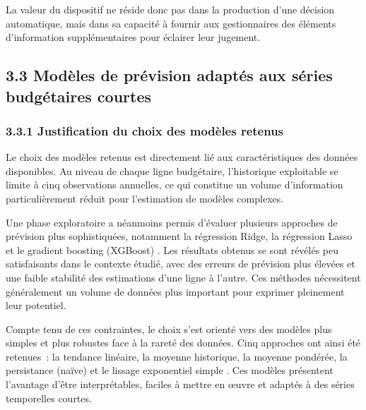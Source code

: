 La valeur du dispositif ne r\'eside donc pas dans la production d'une
d\'ecision automatique, mais dans sa capacit\'e \`a fournir aux gestionnaires
des \'el\'ements d'information suppl\'ementaires pour \'eclairer leur jugement.

\subsection*{3.3 \quad Mod\`eles de pr\'evision adapt\'es aux s\'eries budg\'etaires courtes}

\subsubsection*{3.3.1 \quad Justification du choix des mod\`eles retenus}

Le choix des mod\`eles retenus est directement li\'e aux caract\'eristiques des
donn\'ees disponibles. Au niveau de chaque ligne budg\'etaire, l'historique
exploitable se limite \`a cinq observations annuelles, ce qui constitue un
volume d'information particuli\`erement r\'eduit pour l'estimation de mod\`eles
complexes.

Une phase exploratoire a n\'eanmoins permis d'\'evaluer plusieurs approches de
pr\'evision plus sophistiqu\'ees, notamment la r\'egression Ridge, la r\'egression
Lasso et le gradient boosting (XGBoost) \citep{Hastie2009, Chen2016}. Les
r\'esultats obtenus se sont r\'ev\'el\'es peu satisfaisants dans le contexte
\'etudi\'e, avec des erreurs de pr\'evision plus \'elev\'ees et une faible
stabilit\'e des estimations d'une ligne \`a l'autre. Ces m\'ethodes
n\'ecessitent g\'en\'eralement un volume de donn\'ees plus important pour
exprimer pleinement leur potentiel.

Compte tenu de ces contraintes, le choix s'est orient\'e vers des mod\`eles plus
simples et plus robustes face \`a la raret\'e des donn\'ees. Cinq approches ont
ainsi \'et\'e retenues~: la tendance lin\'eaire, la moyenne historique, la
moyenne pond\'er\'ee, la persistance (na\"ive) et le lissage exponentiel
simple \citep{Hyndman2021, Makridakis2018}. Ces mod\`eles pr\'esentent
l'avantage d'\^etre interpr\'etables, faciles \`a mettre en \oe{}uvre et
adapt\'es \`a des s\'eries temporelles courtes.

